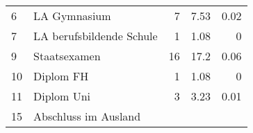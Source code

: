 \begin{longtable}{lXrrr}
     6 &
     \multicolumn{1}{X}{ LA Gymnasium   } &


       \num{7} &
       \num[round-mode=places,round-precision=2]{7.53} &
         \num[round-mode=places,round-precision=2]{0.02} \\

     7 &
     \multicolumn{1}{X}{ LA berufsbildende Schule   } &


       \num{1} &
       \num[round-mode=places,round-precision=2]{1.08} &
         \num[round-mode=places,round-precision=2]{0} \\

     9 &
     \multicolumn{1}{X}{ Staatsexamen   } &


       \num{16} &
       \num[round-mode=places,round-precision=2]{17.2} &
         \num[round-mode=places,round-precision=2]{0.06} \\

     10 &
     \multicolumn{1}{X}{ Diplom FH   } &


       \num{1} &
       \num[round-mode=places,round-precision=2]{1.08} &
         \num[round-mode=places,round-precision=2]{0} \\

     11 &
     \multicolumn{1}{X}{ Diplom Uni   } &


       \num{3} &
       \num[round-mode=places,round-precision=2]{3.23} &
         \num[round-mode=places,round-precision=2]{0.01} \\

     15 &
     \multicolumn{1}{X}{ Abschluss im Ausland   } &



\end{longtable}
